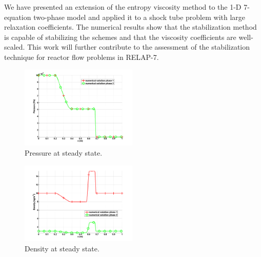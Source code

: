 \documentclass{anstrans}
\begin{document}
We have presented an extension of the entropy viscosity method to the 1-D 7-equation two-phase model and applied it to a shock tube problem with large relaxation coefficients. The numerical results show that the stabilization method is capable of stabilizing the schemes and that the viscosity coefficients are well-scaled. This work will further contribute to the assessment of the stabilization technique for reactor flow problems in RELAP-7.


\begin{figure}[H]
        \centering
                \includegraphics[width=0.495\textwidth]{plots/relaxation_two_phases_pressure.png}
                \caption{Pressure at steady state.}
                \label{fig:pressure}
\end{figure}
\begin{figure}[H]

                \includegraphics[width=0.495\textwidth]{plots/relaxation_two_phases_density.png}
                \caption{Density at steady state.}
                \label{fig:density}
\end{figure}
\end{document}
